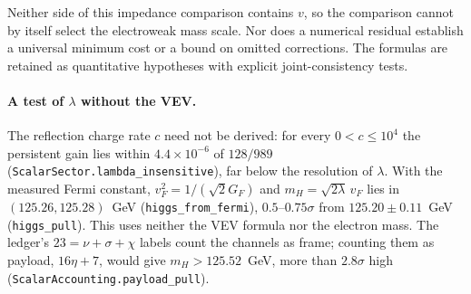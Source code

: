 Neither side of this impedance comparison contains $v$, so the comparison cannot by itself select the electroweak mass scale. Nor does a numerical residual establish a universal minimum cost or a bound on omitted corrections. The formulas are retained as quantitative hypotheses with explicit joint-consistency tests.

\paragraph{A test of $\lambda$ without the VEV.} The reflection charge rate $c$ need not be derived: for every $0<c\le10^4$ the persistent gain lies within $4.4\times10^{-6}$ of $128/989$ (\texttt{ScalarSector.lambda\_insensitive}), far below the resolution of $\lambda$. With the measured Fermi constant, $v_F^2=1/(\sqrt2G_F)$ and $m_H=\sqrt{2\lambda}\,v_F$ lies in $(125.26,125.28)$~GeV (\texttt{higgs\_from\_fermi}), $0.5$--$0.75\sigma$ from $125.20\pm0.11$~GeV (\texttt{higgs\_pull}). This uses neither the VEV formula nor the electron mass. The ledger's $23=\nu+\sigma+\chi$ labels count the channels as frame; counting them as payload, $16\eta+7$, would give $m_H>125.52$~GeV, more than $2.8\sigma$ high (\texttt{ScalarAccounting.payload\_pull}).

